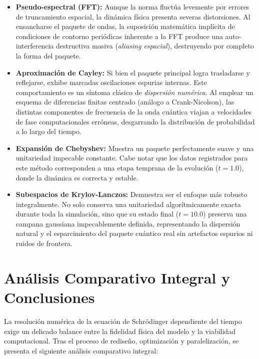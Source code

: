 \documentclass[12pt, a4paper]{article}
\begin{document}
\begin{itemize}
    \item \textbf{Pseudo-espectral (FFT):} Aunque la norma fluctúa levemente por errores de truncamiento espacial, la dinámica física presenta severas distorsiones. Al ensancharse el paquete de ondas, la suposición matemática implícita de condiciones de contorno periódicas inherente a la FFT produce una auto-interferencia destructiva masiva (\textit{aliasing espacial}), destruyendo por completo la forma del paquete.
    
    \item \textbf{Aproximación de Cayley:} Si bien el paquete principal logra trasladarse y reflejarse, exhibe marcadas oscilaciones espurias internas. Este comportamiento es un síntoma clásico de \textit{dispersión numérica}. Al emplear un esquema de diferencias finitas centrado (análogo a Crank-Nicolson), las distintas componentes de frecuencia de la onda cuántica viajan a velocidades de fase computacionales erróneas, desgarrando la distribución de probabilidad a lo largo del tiempo.
    
    \item \textbf{Expansión de Chebyshev:} Muestra un paquete perfectamente suave y una unitariedad impecable constante. Cabe notar que los datos registrados para este método corresponden a una etapa temprana de la evolución ($t=1.0$), donde la dinámica es correcta y estable.
    
    \item \textbf{Subespacios de Krylov-Lanczos:} Demuestra ser el enfoque más robusto integralmente. No solo conserva una unitariedad algorítmicamente exacta durante toda la simulación, sino que su estado final ($t=10.0$) preserva una campana gaussiana impecablemente definida, representando la dispersión natural y el esparcimiento del paquete cuántico real sin artefactos espurios ni ruidos de frontera.
\end{itemize}


\section{Análisis Comparativo Integral y Conclusiones}
\label{sec:conclusiones}

La resolución numérica de la ecuación de Schrödinger dependiente del tiempo exige un delicado balance entre la fidelidad física del modelo y la viabilidad computacional. Tras el proceso de rediseño, optimización y paralelización, se presenta el siguiente análisis comparativo integral:
\end{document}
